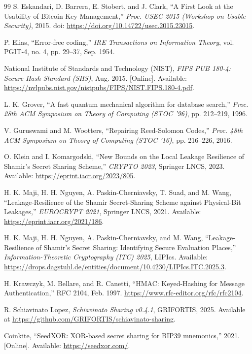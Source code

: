 \documentclass[11pt]{article}
\begin{document}
\begin{thebibliography}{99}
S. Eskandari, D. Barrera, E. Stobert, and J. Clark,
``A First Look at the Usability of Bitcoin Key Management,''
\textit{Proc. USEC 2015 (Workshop on Usable Security)}, 2015.
doi: \url{https://doi.org/10.14722/usec.2015.23015}.

P. Elias,
``Error-free coding,''
\textit{IRE Transactions on Information Theory}, vol. PGIT-4, no. 4, pp. 29--37, Sep. 1954.

National Institute of Standards and Technology (NIST),
\textit{FIPS PUB 180-4: Secure Hash Standard (SHS)}, Aug. 2015.
[Online]. Available: \url{https://nvlpubs.nist.gov/nistpubs/FIPS/NIST.FIPS.180-4.pdf}.

L. K. Grover,
``A fast quantum mechanical algorithm for database search,''
\textit{Proc. 28th ACM Symposium on Theory of Computing (STOC '96)}, pp. 212--219, 1996.

V. Guruswami and M. Wootters,
``Repairing Reed-Solomon Codes,''
\textit{Proc. 48th ACM Symposium on Theory of Computing (STOC '16)}, pp. 216--226, 2016.

O. Klein and I. Komargodski,
``New Bounds on the Local Leakage Resilience of Shamir's Secret Sharing Scheme,''
\textit{CRYPTO 2023}, Springer LNCS, 2023.
Available: \url{https://eprint.iacr.org/2023/805}.

H. K. Maji, H. H. Nguyen, A. Paskin-Cherniavsky, T. Suad, and M. Wang,
``Leakage-Resilience of the Shamir Secret-Sharing Scheme against Physical-Bit Leakages,''
\textit{EUROCRYPT 2021}, Springer LNCS, 2021.
Available: \url{https://eprint.iacr.org/2021/186}.

H. K. Maji, H. H. Nguyen, A. Paskin-Cherniavsky, and M. Wang,
``Leakage-Resilience of Shamir's Secret Sharing: Identifying Secure Evaluation Places,''
\textit{Information-Theoretic Cryptography (ITC) 2025}, LIPIcs.
Available: \url{https://drops.dagstuhl.de/entities/document/10.4230/LIPIcs.ITC.2025.3}.

H. Krawczyk, M. Bellare, and R. Canetti,
``HMAC: Keyed-Hashing for Message Authentication,''
RFC 2104, Feb. 1997. \url{https://www.rfc-editor.org/rfc/rfc2104}.

R. Schiavinato Lopez,
\textit{Schiavinato Sharing v0.4.1}, GRIFORTIS, 2025.
Available at \url{https://github.com/GRIFORTIS/schiavinato-sharing}.

Coinkite,
``SeedXOR: XOR-based secret sharing for BIP39 mnemonics,'' 2021.
[Online]. Available: \url{https://seedxor.com/}.


\end{thebibliography}
\end{document}
